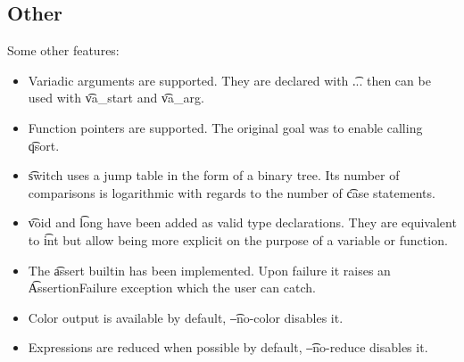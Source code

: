 \subsection{Other}
Some other features:
\begin{itemize}
    \item Variadic arguments are supported. They are declared with \t{...} then can be used with \t{va\_start} and \t{va\_arg}.
    \item Function pointers are supported. The original goal was to enable calling \t{qsort}.
    \item \t{switch} uses a jump table in the form of a binary tree. Its number of comparisons is logarithmic with regards to the number of \t{case} statements.
    \item \t{void} and \t{long} have been added as valid type declarations. They are equivalent to \t{int} but allow being more explicit on the purpose of a variable or function.
    \item The \t{assert} builtin has been implemented. Upon failure it raises an \t{AssertionFailure} exception which the user can catch.
    \item Color output is available by default, \t{--no-color} disables it.
    \item Expressions are reduced when possible by default, \t{--no-reduce} disables it.
\end{itemize}
